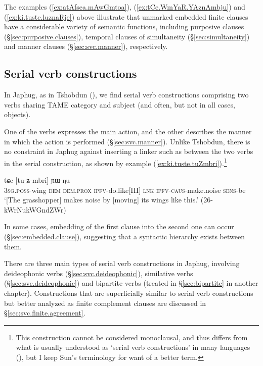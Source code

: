 The examples (\ref{ex:atAfsea.mAwGmtoa}), (\ref{ex:tCe.WmYaR.YAznAmbju}) and (\ref{ex:ki.tuste.luznaRje}) above illustrate that unmarked embedded finite clauses have a considerable variety of semantic functions, including purposive clauses (§\ref{sec:purposive.clauses}), temporal clauses of simultaneity (§\ref{sec:simultaneity}) and manner clauses (§\ref{sec:svc.manner}), respectively.


\subsection{Serial verb constructions} \label{sec:svc}
In Japhug, as in Tshobdun (\citealt[490--491]{sun12complementation}), we find serial verb constructions comprising two verbs sharing TAME category and subject (and often, but not in all cases, objects). 
 
One of the verbs expresses the main action, and the other describes the manner in which the action is performed (§\ref{sec:svc.manner}). Unlike Tshobdun, there is no constraint in Japhug against inserting a linker such as  between the two verbs in the serial construction, as shown by example (\ref{ex:ki.tuste.tuZmbri}).\footnote{This construction cannot be considered monoclausal, and thus differs from what is usually understood as `serial verb constructions' in many languages (\citealt[6]{aikhenvald06svc}), but I keep Sun's terminology for want of a better term. }

\begin{exe}
\ex \label{ex:ki.tuste.tuZmbri}
 tɕe [tu-ʑ-mbri] ɲɯ-ŋu \\
\textsc{3sg}.\textsc{poss}-wing \textsc{dem} \textsc{dem}.\textsc{prox} \textsc{ipfv}-do.like[III] \textsc{lnk} \textsc{ipfv}-\textsc{caus}-make.noise \textsc{sens}-be \\
\glt `[The grasshopper] makes noise by [moving] its wings like this.' (26-kWrNukWGndZWr)
\end{exe}

In some cases, embedding of the first clause into the second one can occur (§\ref{sec:embedded.clause}), suggesting that a syntactic hierarchy exists between them.

There are three main types of serial verb constructions in Japhug, involving deideophonic verbs (§\ref{sec:svc.deideophonic}), similative verbs (§\ref{sec:svc.deideophonic}) and bipartite verbs (treated in §\ref{sec:bipartite} in another chapter). Constructions that are superficially similar to serial verb constructions but better analyzed as finite complement clauses are discussed in §\ref{sec:svc.finite.agreement}.


